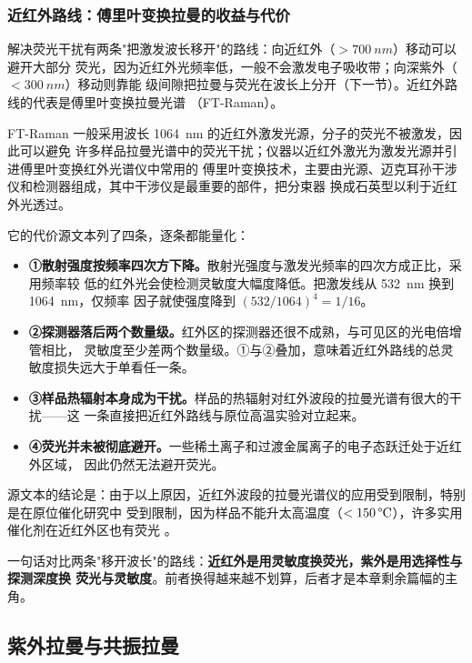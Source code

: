 \subsubsection{近红外路线：傅里叶变换拉曼的收益与代价}

解决荧光干扰有两条"把激发波长移开"的路线：向近红外（$>\qty{700}{nm}$）移动可以避开大部分
荧光，因为近红外光频率低，一般不会激发电子吸收带；向深紫外（$<\qty{300}{nm}$）移动则靠能
级间隙把拉曼与荧光在波长上分开（下一节）。近红外路线的代表是傅里叶变换拉曼光谱
（FT-Raman）。

FT-Raman 一般采用波长 \qty{1064}{nm} 的近红外激发光源，分子的荧光不被激发，因此可以避免
许多样品拉曼光谱中的荧光干扰；仪器以近红外激光为激发光源并引进傅里叶变换红外光谱仪中常用的
傅里叶变换技术，主要由光源、迈克耳孙干涉仪和检测器组成，其中干涉仪是最重要的部件，把分束器
换成石英型以利于近红外光透过。

它的代价源文本列了四条，逐条都能量化：
\begin{itemize}
\item \textbf{①散射强度按频率四次方下降。}散射光强度与激发光频率的四次方成正比，采用频率较
  低的红外光会使检测灵敏度大幅度降低。把激发线从 \qty{532}{nm} 换到 \qty{1064}{nm}，仅频率
  因子就使强度降到 $(532/1064)^4=1/16$。
\item \textbf{②探测器落后两个数量级。}红外区的探测器还很不成熟，与可见区的光电倍增管相比，
  灵敏度至少差两个数量级。①与②叠加，意味着近红外路线的总灵敏度损失远大于单看任一条。
\item \textbf{③样品热辐射本身成为干扰。}样品的热辐射对红外波段的拉曼光谱有很大的干扰——这
  一条直接把近红外路线与原位高温实验对立起来。
\item \textbf{④荧光并未被彻底避开。}一些稀土离子和过渡金属离子的电子态跃迁处于近红外区域，
  因此仍然无法避开荧光。
\end{itemize}
源文本的结论是：由于以上原因，近红外波段的拉曼光谱仪的应用受到限制，特别是在原位催化研究中
受到限制，因为样品不能升太高温度（$<\qty{150}{\degC}$），许多实用催化剂在近红外区也有荧光
。

一句话对比两条"移开波长"的路线：\textbf{近红外是用灵敏度换荧光，紫外是用选择性与探测深度换
荧光与灵敏度}。前者换得越来越不划算，后者才是本章剩余篇幅的主角。

\subsection{紫外拉曼与共振拉曼}

